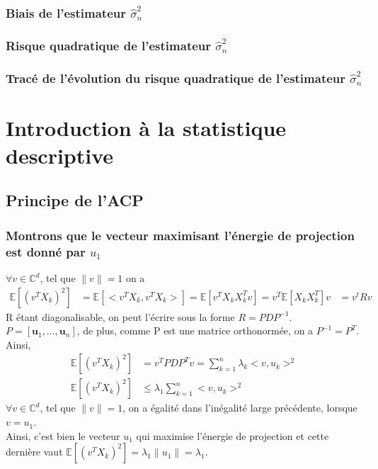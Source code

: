 \documentclass{report}
\begin{document}
		\subsection{Biais de l'estimateur $\hat\sigma^2_n$}
		\subsection{Risque quadratique de l'estimateur $\hat\sigma^2_n$}
		\subsection{Tracé de l'évolution du risque quadratique de l'estimateur $\hat\sigma^2_n$}

\chapter{Introduction à la statistique descriptive}
	\section{Principe de l'ACP}
		\subsection{Montrons que le vecteur maximisant l'énergie de projection est donné par $u_1$}
			$\forall v \in \mathbb{C}^d$, tel que $\lVert v \rVert = 1$ on a
			\begin{align*}
				\mathbb{E}[(v^TX_k)^2] &= \mathbb{E}[<v^TX_k, v^TX_k>] = \mathbb{E}[v^TX_kX_k^Tv] = v^T\mathbb{E}[X_kX_k^T]v
				&= v^tRv 
			\end{align*}
			R étant diagonalisable, on peut l'écrire sous la forme $R=PDP^{-1}$.\\
			$P = [\textbf{u}_1, \ldots, \textbf{u}_n]$, de plus, comme P est une matrice orthonormée, on a $P^{-1} = P^T$.\\
			Ainsi, 
			\begin{align*}
				\mathbb{E}[(v^TX_k)^2] &= v^TPDP^Tv = \sum\limits_{k=1}^n \lambda_k<v, u_k>^2\\
				\mathbb{E}[(v^TX_k)^2] &\leq \lambda_1\sum\limits_{k=1}^n <v, u_k>^2
			\end{align*}
			$\forall v \in \mathbb{C}^d$, tel que $\lVert v \rVert = 1$, on a égalité dans l'inégalité large précédente, lorsque $v=u_1$. \\
			Ainsi, c'est bien le vecteur $u_1$ qui maximise l'énergie de projection et cette dernière vaut $\mathbb{E}[(v^TX_k)^2] = \lambda_1 \lVert u_1 \rVert = \lambda_1$.
\end{document}
